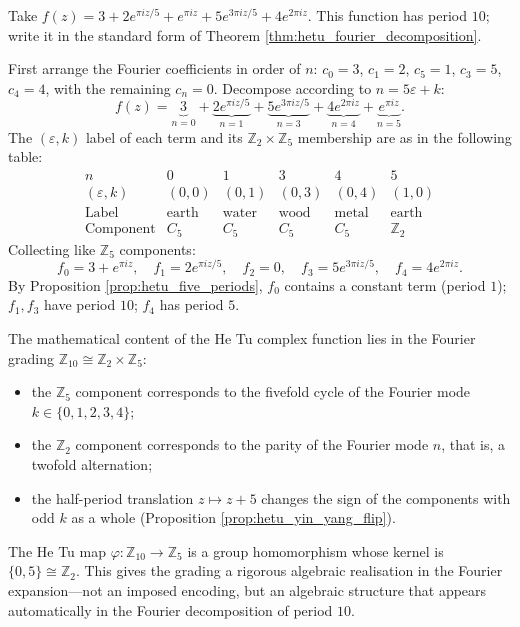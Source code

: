 \begin{example}\label{ex:hetu_concrete}
Take $f(z) = 3 + 2 e^{\pi i z / 5} + e^{\pi i z} + 5 e^{3\pi i z / 5} + 4 e^{2\pi i z}$. This function has period $10$; write it in the standard form of Theorem \ref{thm:hetu_fourier_decomposition}.

First arrange the Fourier coefficients in order of $n$: $c_0 = 3$, $c_1 = 2$, $c_5 = 1$, $c_3 = 5$, $c_4 = 4$, with the remaining $c_n = 0$. Decompose according to $n = 5\varepsilon + k$:
\[
f(z) = \underbrace{3}_{n=0} + \underbrace{2 e^{\pi i z / 5}}_{n=1} + \underbrace{5 e^{3\pi i z / 5}}_{n=3} + \underbrace{4 e^{2\pi i z}}_{n=4} + \underbrace{e^{\pi i z}}_{n=5}.
\]
The $(\varepsilon, k)$ label of each term and its $\mathbb{Z}_2 \times \mathbb{Z}_5$ membership are as in the following table:
\[
\begin{array}{c|ccccc}
n & 0 & 1 & 3 & 4 & 5 \\
\hline
(\varepsilon, k) & (0, 0) & (0, 1) & (0, 3) & (0, 4) & (1, 0) \\
\text{Label} & \text{earth} & \text{water} & \text{wood} & \text{metal} & \text{earth} \\
\text{Component} & C_5 & C_5 & C_5 & C_5 & \mathbb{Z}_2
\end{array}
\]
Collecting like $\mathbb{Z}_5$ components:
\[
f_0 = 3 + e^{\pi i z}, \quad f_1 = 2 e^{\pi i z/5}, \quad f_2 = 0, \quad f_3 = 5 e^{3\pi i z/5}, \quad f_4 = 4 e^{2\pi i z}.
\]
By Proposition \ref{prop:hetu_five_periods}, $f_0$ contains a constant term (period $1$); $f_1, f_3$ have period $10$; $f_4$ has period $5$.
\end{example}

\begin{remark}\label{rem:hetu_algebraic_meaning}
The mathematical content of the He Tu complex function lies in the Fourier grading $\mathbb{Z}_{10} \cong \mathbb{Z}_2 \times \mathbb{Z}_5$:
\begin{itemize}
    \item the $\mathbb{Z}_5$ component corresponds to the fivefold cycle of the Fourier mode $k \in \{0,1,2,3,4\}$;
    \item the $\mathbb{Z}_2$ component corresponds to the parity of the Fourier mode $n$, that is, a twofold alternation;
    \item the half-period translation $z \mapsto z + 5$ changes the sign of the components with odd $k$ as a whole (Proposition \ref{prop:hetu_yin_yang_flip}).
\end{itemize}
The He Tu map $\varphi: \mathbb{Z}_{10} \to \mathbb{Z}_5$ is a group homomorphism whose kernel is $\{0, 5\} \cong \mathbb{Z}_2$. This gives the grading a rigorous algebraic realisation in the Fourier expansion---not an imposed encoding, but an algebraic structure that appears automatically in the Fourier decomposition of period $10$.
\end{remark}

